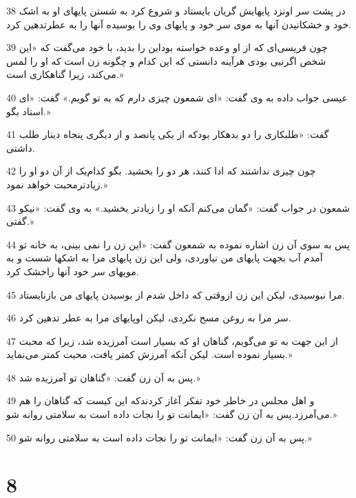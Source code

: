 \par 38 در پشت سر اونزد پایهایش گریان بایستاد و شروع کرد به شستن پایهای او به اشک خود و خشکانیدن آنها به موی سر خود و پایهای وی را بوسیده آنها را به عطرتدهین کرد.
\par 39 چون فریسی‌ای که از او وعده خواسته بوداین را بدید، با خود می‌گفت که «این شخص اگرنبی بودی هرآینه دانستی که این کدام و چگونه زن است که او را لمس می‌کند، زیرا گناهکاری است.»
\par 40 عیسی جواب داده به وی گفت: «ای شمعون چیزی دارم که به تو گویم.» گفت: «ای استاد بگو.»
\par 41 گفت: «طلبکاری را دو بدهکار بودکه از یکی پانصد و از دیگری پنجاه دینار طلب داشتی.
\par 42 چون چیزی نداشتند که ادا کنند، هر دو را بخشید. بگو کدام‌یک از آن دو او را زیادترمحبت خواهد نمود.»
\par 43 شمعون در جواب گفت: «گمان می‌کنم آنکه او را زیادتر بخشید.» به وی گفت: «نیکو گفتی.»
\par 44 پس به سوی آن زن اشاره نموده به شمعون گفت: «این زن را نمی بینی، به خانه تو آمدم آب بجهت پایهای من نیاوردی، ولی این زن پایهای مرا به اشکها شست و به مویهای سر خود آنها راخشک کرد.
\par 45 مرا نبوسیدی، لیکن این زن ازوقتی که داخل شدم از بوسیدن پایهای من بازنایستاد.
\par 46 سر مرا به روغن مسح نکردی، لیکن اوپایهای مرا به عطر تدهین کرد.
\par 47 از این جهت به تو می‌گویم، گناهان او که بسیار است آمرزیده شد، زیرا که محبت بسیار نموده است. لیکن آنکه آمرزش کمتر یافت، محبت کمتر می‌نماید.»
\par 48 پس به آن زن گفت: «گناهان تو آمرزیده شد.»
\par 49 و اهل مجلس در خاطر خود تفکر آغاز کردندکه این کیست که گناهان را هم می‌آمرزد.پس به آن زن گفت: «ایمانت تو را نجات داده است به سلامتی روانه شو.»
\par 50 پس به آن زن گفت: «ایمانت تو را نجات داده است به سلامتی روانه شو.»

\chapter{8}


